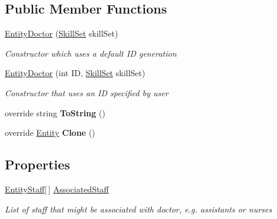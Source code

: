 \subsection*{Public Member Functions}
\begin{DoxyCompactItemize}
\item 
\hyperlink{class_general_health_care_elements_1_1_entities_1_1_entity_doctor_aa4b6472dc6509907b41ef1f2e587d213}{Entity\+Doctor} (\hyperlink{class_simulation_core_1_1_h_c_c_m_elements_1_1_skill_set}{Skill\+Set} skill\+Set)
\begin{DoxyCompactList}\small\item\em Constructor which uses a default ID generation \end{DoxyCompactList}\item 
\hyperlink{class_general_health_care_elements_1_1_entities_1_1_entity_doctor_a3aa6a9293136733c2e65bbdd57efa7aa}{Entity\+Doctor} (int ID, \hyperlink{class_simulation_core_1_1_h_c_c_m_elements_1_1_skill_set}{Skill\+Set} skill\+Set)
\begin{DoxyCompactList}\small\item\em Constructor that uses an ID specified by user \end{DoxyCompactList}\item 
override string {\bfseries To\+String} ()\hypertarget{class_general_health_care_elements_1_1_entities_1_1_entity_doctor_a464d50b814847c45c881160105b16f27}{}\label{class_general_health_care_elements_1_1_entities_1_1_entity_doctor_a464d50b814847c45c881160105b16f27}

\item 
override \hyperlink{class_simulation_core_1_1_h_c_c_m_elements_1_1_entity}{Entity} {\bfseries Clone} ()\hypertarget{class_general_health_care_elements_1_1_entities_1_1_entity_doctor_a8a0c26f950c0822930e6a433c5d304c4}{}\label{class_general_health_care_elements_1_1_entities_1_1_entity_doctor_a8a0c26f950c0822930e6a433c5d304c4}

\end{DoxyCompactItemize}
\subsection*{Properties}
\begin{DoxyCompactItemize}
\item 
\hyperlink{class_simulation_core_1_1_h_c_c_m_elements_1_1_entity_staff}{Entity\+Staff}\mbox{[}$\,$\mbox{]} \hyperlink{class_general_health_care_elements_1_1_entities_1_1_entity_doctor_a7aa2807b41ee0ba1597db242bd4aa645}{Associated\+Staff}
\begin{DoxyCompactList}\small\item\em List of staff that might be associated with doctor, e.\+g. assistants or nurses \end{DoxyCompactList}\end{DoxyCompactItemize}


